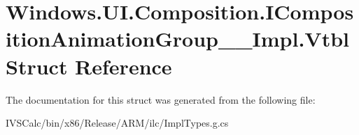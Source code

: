 \hypertarget{struct_windows_1_1_u_i_1_1_composition_1_1_i_composition_animation_group_____impl_1_1_vtbl}{}\section{Windows.\+U\+I.\+Composition.\+I\+Composition\+Animation\+Group\+\_\+\+\_\+\+Impl.\+Vtbl Struct Reference}
\label{struct_windows_1_1_u_i_1_1_composition_1_1_i_composition_animation_group_____impl_1_1_vtbl}


The documentation for this struct was generated from the following file\+:\begin{DoxyCompactItemize}
\item 
I\+V\+S\+Calc/bin/x86/\+Release/\+A\+R\+M/ilc/Impl\+Types.\+g.\+cs\end{DoxyCompactItemize}
